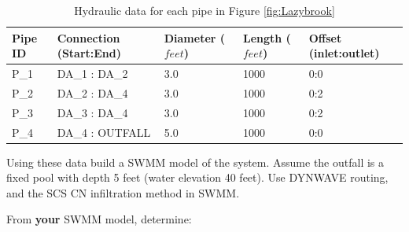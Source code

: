 \documentclass[12pt]{article}
\begin{document}
\begin{enumerate}
\begin{table}[ht!]
      \caption{Hydraulic data for each pipe in Figure \ref{fig:Lazybrook} \\}
   \begin{tabular}{| p{0.6in} | p{1.7in} | p{0.9in} | p{0.9in} | p{1.4in} |} %
   \hline
   \hline
Pipe ID & Connection (Start:End) & Diameter ($feet$) & Length ($feet$) & Offset (inlet:outlet) \\
\hline
\hline
P\_1 & DA\_1 : DA\_2 & 3.0 & 1000 & 0:0 \\
P\_2 & DA\_2 : DA\_4 & 3.0 & 1000 & 0:2 \\
P\_3 & DA\_3 : DA\_4 & 3.0 & 1000 & 0:2 \\
P\_4 & DA\_4 : OUTFALL & 5.0 & 1000 & 0:0\\
\hline
\hline
   \end{tabular}
   \label{tab:pipes}
\end{table}

Using these data build a SWMM model of the system.  Assume the outfall is a fixed pool with depth 5 feet (water elevation 40 feet).   Use DYNWAVE routing, and the SCS CN infiltration method in SWMM. 

From \textbf{your} SWMM model, determine:


\end{enumerate}
\end{document}
